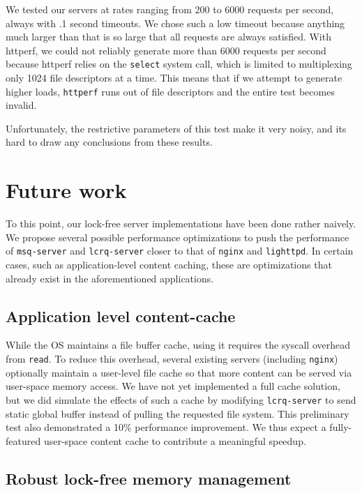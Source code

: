 \documentclass[twoside,10pt]{article}
\begin{document}
\begin{multicols}{2}
We tested our servers at rates ranging from 200 to 6000 requests per
second, always with .1 second timeouts. We chose such a low timeout
because anything much larger than that is so large that all requests
are always satisfied. With httperf, we could not reliably generate
more than 6000 requests per second because httperf relies on the
\verb+select+ system call, which is limited to multiplexing only 1024
file descriptors at a time. This means that if we attempt to generate
higher loads, \verb+httperf+ runs out of file descriptors and the
entire test becomes invalid.

Unfortunately, the restrictive parameters of this test make it very noisy, 
and its hard to draw any conclusions from these results. 

\section{Future work}

To this point, our lock-free server implementations have been done
rather naively. We propose several possible performance optimizations
to push the performance of \verb+msq-server+ and \verb+lcrq-server+
closer to that of \verb+nginx+ and \verb+lighttpd+. In certain cases,
such as application-level content caching, these are optimizations
that already exist in the aforementioned applications.

\subsection{Application level content-cache}
While the OS maintains a file buffer cache, using it requires the
syscall overhead from \verb+read+. To reduce this overhead, several
existing servers (including \verb+nginx+) optionally maintain a
user-level file cache so that more content can be served via
user-space memory access. We have not yet implemented a full cache
solution, but we did simulate the effects of such a cache by modifying
\verb+lcrq-server+ to send static global buffer instead of pulling the
requested file system. This preliminary test also demonstrated a 10\%
performance improvement. We thus expect a fully-featured user-space
content cache to contribute a meaningful speedup.

\subsection{Robust lock-free memory management}


\end{multicols}
\end{document}
